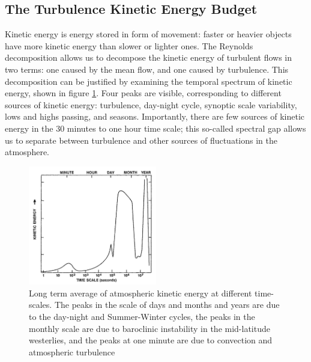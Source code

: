 \documentclass[a4paper]{book}
\begin{document}
\subsection{The Turbulence Kinetic Energy Budget}
Kinetic energy is energy stored in form of movement: faster or heavier objects have more kinetic energy than slower or lighter ones. The Reynolds decomposition allows us to decompose the kinetic energy of turbulent flows in two terms: one caused by the mean flow, and one caused by turbulence. This decomposition can be justified by examining the temporal spectrum of kinetic energy, shown in figure \ref{fig:tkespectrum}. Four peaks are visible, corresponding to different sources of kinetic energy: turbulence, day-night cycle, synoptic scale variability, lows and highs passing, and seasons. Importantly, there are few sources of kinetic energy in the 30 minutes to one hour time scale; this so-called spectral gap allows us to separate between turbulence and other sources of fluctuations in the atmosphere.

\begin{figure}
\caption{Long term average of atmospheric kinetic energy at different time-scales. The peaks in the scale of days and months and years are due to the day-night and Summer-Winter cycles, the peaks in the monthly scale are due to baroclinic instability in the mid-latitude westerlies, and the peaks at one minute are due to convection and atmospheric turbulence \citep{tkespectrumsrc,tkespectrumorig}}
\label{fig:tkespectrum}
\centering
\includegraphics[width=0.5\textwidth]{images/kinetic_energy_spectrum}
\end{figure}
\end{document}
